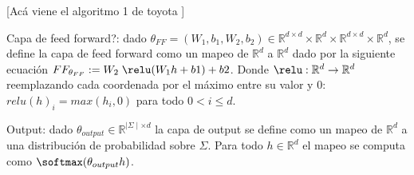 [Acá viene el algoritmo 1 de toyota ]

Capa de feed forward?: dado $\theta_{FF} = (W_1 , b_1 , W_2 , b_2) \in \mathbb{R}^{d \times d} \times \mathbb{R}^d \times \mathbb{R}^{d \times d} \times \mathbb{R}^d$, se define la capa de feed forward como un mapeo de $\mathbb{R}^d$ a $\mathbb{R}^d$ dado por la siguiente ecuación $FF_{\theta_{FF}} := W_2 \; \relu(W_1 h + b1 ) + b2$. Donde $\relu: \mathbb{R}^d \to \mathbb{R}^d$ reemplazando cada coordenada por el máximo entre su valor y $0$: $relu(h)_i = max(h_i, 0)$ para todo $0 < i \leq d$.

Output: dado $\theta_{output} \in \mathbb{R}^{\mid \Sigma \mid \times d}$ la capa de output se define como un mapeo de $\mathbb{R}^d$ a una distribución de probabilidad sobre $\Sigma$. Para todo $h \in \mathbb{R}^d$ el mapeo se computa como $\softmax(\theta_{output}h)$.












